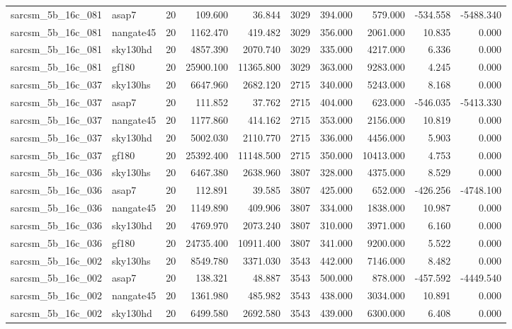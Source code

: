 \begin{tabular}{llrrrrrrrr}
sarcsm\_5b\_16c\_081 & asap7 & 20 & 109.600 & 36.844 & 3029 & 394.000 & 579.000 & -534.558 & -5488.340 \\
sarcsm\_5b\_16c\_081 & nangate45 & 20 & 1162.470 & 419.482 & 3029 & 356.000 & 2061.000 & 10.835 & 0.000 \\
sarcsm\_5b\_16c\_081 & sky130hd & 20 & 4857.390 & 2070.740 & 3029 & 335.000 & 4217.000 & 6.336 & 0.000 \\
sarcsm\_5b\_16c\_081 & gf180 & 20 & 25900.100 & 11365.800 & 3029 & 363.000 & 9283.000 & 4.245 & 0.000 \\
sarcsm\_5b\_16c\_037 & sky130hs & 20 & 6647.960 & 2682.120 & 2715 & 340.000 & 5243.000 & 8.168 & 0.000 \\
sarcsm\_5b\_16c\_037 & asap7 & 20 & 111.852 & 37.762 & 2715 & 404.000 & 623.000 & -546.035 & -5413.330 \\
sarcsm\_5b\_16c\_037 & nangate45 & 20 & 1177.860 & 414.162 & 2715 & 353.000 & 2156.000 & 10.819 & 0.000 \\
sarcsm\_5b\_16c\_037 & sky130hd & 20 & 5002.030 & 2110.770 & 2715 & 336.000 & 4456.000 & 5.903 & 0.000 \\
sarcsm\_5b\_16c\_037 & gf180 & 20 & 25392.400 & 11148.500 & 2715 & 350.000 & 10413.000 & 4.753 & 0.000 \\
sarcsm\_5b\_16c\_036 & sky130hs & 20 & 6467.380 & 2638.960 & 3807 & 328.000 & 4375.000 & 8.529 & 0.000 \\
sarcsm\_5b\_16c\_036 & asap7 & 20 & 112.891 & 39.585 & 3807 & 425.000 & 652.000 & -426.256 & -4748.100 \\
sarcsm\_5b\_16c\_036 & nangate45 & 20 & 1149.890 & 409.906 & 3807 & 334.000 & 1838.000 & 10.987 & 0.000 \\
sarcsm\_5b\_16c\_036 & sky130hd & 20 & 4769.970 & 2073.240 & 3807 & 310.000 & 3971.000 & 6.160 & 0.000 \\
sarcsm\_5b\_16c\_036 & gf180 & 20 & 24735.400 & 10911.400 & 3807 & 341.000 & 9200.000 & 5.522 & 0.000 \\
sarcsm\_5b\_16c\_002 & sky130hs & 20 & 8549.780 & 3371.030 & 3543 & 442.000 & 7146.000 & 8.482 & 0.000 \\
sarcsm\_5b\_16c\_002 & asap7 & 20 & 138.321 & 48.887 & 3543 & 500.000 & 878.000 & -457.592 & -4449.540 \\
sarcsm\_5b\_16c\_002 & nangate45 & 20 & 1361.980 & 485.982 & 3543 & 438.000 & 3034.000 & 10.891 & 0.000 \\
sarcsm\_5b\_16c\_002 & sky130hd & 20 & 6499.580 & 2692.580 & 3543 & 439.000 & 6300.000 & 6.408 & 0.000 \\

\end{tabular}
